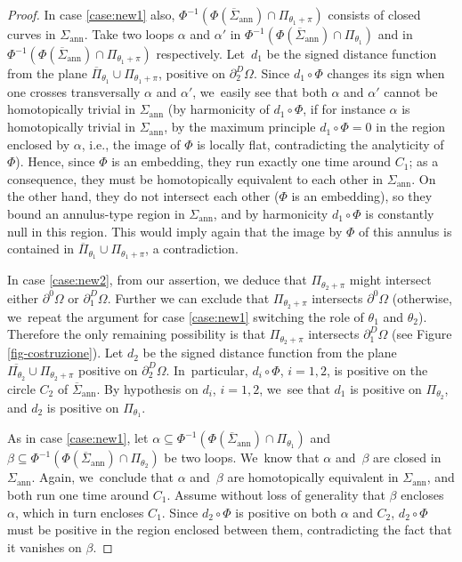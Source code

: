 \documentclass[11pt]{article}
\newcommand{\ie}{i.e.,\xspace}
\numberwithin{equation}{section}
\let\Om\Omega
\newcommand{\openannulus}{\Sigma_\mathrm{ann}}
\newcommand{\immclosedann}{\Phi({\overline\Sigma}_\mathrm{ann})}
\theoremstyle{definition}
\begin{document}
\begin{proof}
In case \ref{case:new1} also, $\Phi^{-1}(\immclosedann\cap \Pi_{\theta_1+\pi})$ consists of closed curves in $\openannulus$.
Take two loops $\alpha$ and $\alpha'$ in $ \Phi^{-1}(
\immclosedann\cap \Pi_{\theta_1})$ and in $ \Phi^{-1}(
\immclosedann\cap \Pi_{\theta_1+\pi})$ respectively.
Let~$d_1$ be the signed distance function from the plane $\overline\Pi_{\theta_1}\cup\Pi_{\theta_1+\pi}$, positive on $\partial_2^D\Om$. Since $d_1\circ\Phi$ changes its sign when one crosses
transversally $\alpha$ and $\alpha'$, we~easily see that both $\alpha$ and $\alpha'$ cannot be homotopically trivial in $\openannulus$ (by harmonicity of $d_1\circ\Phi$, if for instance $\alpha $ is homotopically trivial in $\openannulus$, by the maximum principle $d_1\circ\Phi=0$ in the region enclosed by $\alpha$, \ie the image of $\Phi$ is locally flat, contradicting the analyticity of $\Phi$). Hence, since $\Phi$ is an embedding, they run exactly one time around $C_1$; as a consequence, they must be homotopically equivalent to each other in $\openannulus$. On the other hand, they do not intersect each other
($\Phi$ is an embedding), so they bound an annulus-type region in $\openannulus$, and by harmonicity $d_1\circ\Phi$ is constantly null in this region.
This would imply again that the image by $\Phi$ of this annulus is contained in $\overline \Pi_{\theta_1}\cup\Pi_{\theta_1+\pi}$, a contradiction.

In case \ref{case:new2}, from our assertion, we
deduce that $\Pi_{\theta_2+\pi}$ might intersect either $\partial^0\Om$ or $\partial^D_1\Om$.
Further we can exclude that $\Pi_{\theta_2+\pi}$ intersects $\partial^0\Om$ (otherwise, we~repeat the argument for case \ref{case:new1} switching the role of $\theta_1$ and $\theta_2$).
Therefore the only remaining possibility is that $\Pi_{\theta_2+\pi}$ intersects $\partial_1^D\Om$ (see Figure \ref{fig-costruzione}).
Let $d_2$ be the signed distance function from the plane $\overline{\Pi_{\theta_2}}\cup\Pi_{\theta_2+\pi}$ positive on $\partial_2^D\Om$. In~particular, $d_i\circ\Phi$, $i=1,2$, is positive on the circle $C_2$ of
$\overline\Sigma_\mathrm{ann}$. By hypothesis on $d_i$, $i=1,2$, we~see that $d_1$ is positive on $\Pi_{\theta_2}$, and $d_2$ is positive on $\Pi_{\theta_1}$.

As in case \ref{case:new1}, let $\alpha\subseteq \Phi^{-1}(\immclosedann\cap \Pi_{\theta_1})$ and
$\beta\subseteq \Phi^{-1}(\immclosedann\cap \Pi_{\theta_2})$
be two loops. We~know that $\alpha$ and~$\beta$ are closed in $\openannulus$.
Again, we~conclude that $\alpha$ and~$\beta$ are homotopically equivalent in $\openannulus$, and both run one time around $C_1$. Assume without loss of generality that $\beta$ encloses $\alpha$, which in turn encloses $C_1$. Since $d_2\circ\Phi$ is positive on both $\alpha$ and $C_2$, $d_2\circ\Phi$ must be positive in the region enclosed between them, contradicting the fact that it
vanishes on $\beta$.


\end{proof}
\end{document}
